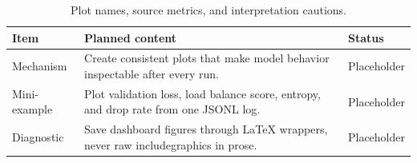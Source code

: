 \begin{table}[H]
\centering
\caption{Plot names, source metrics, and interpretation cautions.}
\label{tab:ch11-loss-curves-and-routing-dashboards}
\begin{tabularx}{\textwidth}{p{}X p{}}
\toprule
Item & Planned content & Status \\
\midrule
Mechanism & Create consistent plots that make model behavior inspectable after every run. & Placeholder \\
Mini-example & Plot validation loss, load balance score, entropy, and drop rate from one JSONL log. & Placeholder \\
Diagnostic & Save dashboard figures through LaTeX wrappers, never raw includegraphics in prose. & Placeholder \\
\bottomrule
\end{tabularx}
\end{table}
